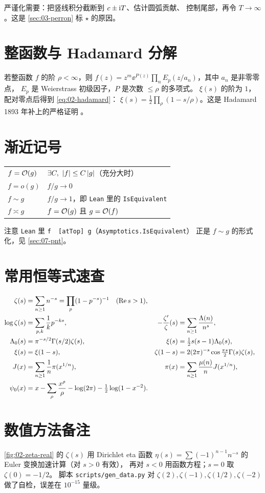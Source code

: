 严谨化需要：把竖线积分截断到 $c\pm\mathrm{i} T$、估计圆弧贡献、
控制尾部，再令 $T\to\infty$。这是 \cref{sec:03-perron} 标 $\star$ 的原因。

\section{整函数与 Hadamard 分解}
若整函数 $f$ 的阶 $\rho<\infty$，则
$f(z)=z^m\ee^{P(z)}\prod_n E_p(z/a_n)$，其中 $a_n$ 是非零零点，
$E_p$ 是 Weierstrass 初级因子，$P$ 是次数 $\le\rho$ 的多项式。
$\xi(s)$ 的阶为 $1$，配对零点后得到 \cref{eq:02-hadamard}：
$\xi(s)=\tfrac12\prod_\rho(1-s/\rho)$。这是 Hadamard 1893 年补上的严格证明
\cite{hadamard1893}。

\section{渐近记号}
\begin{center}\small
\begin{tabular}{@{}ll@{}}
\toprule
$f=\mathcal{O}(g)$ & $\exists C,\ \abs{f}\le C\abs{g}$（充分大时）\\
$f=o(g)$ & $f/g\to0$\\
$f\sim g$ & $f/g\to1$，即 \texttt{Lean} 里的 \texttt{IsEquivalent}\\
$f\asymp g$ & $f=\mathcal{O}(g)$ 且 $g=\mathcal{O}(f)$\\
\bottomrule
\end{tabular}
\end{center}
注意 \texttt{Lean} 里 \texttt{f ~[atTop] g}（\texttt{Asymptotics.IsEquivalent}）
正是 $f\sim g$ 的形式化，见 \cref{sec:07-pnt}。

\section{常用恒等式速查}
\begin{align}
 \zeta(s)&=\sum_{n\ge1}n^{-s}=\prod_p(1-p^{-s})^{-1}\quad(\operatorname{Re} s>1),\\
 \log\zeta(s)&=\sum_{p,k}\frac{1}{k}p^{-ks},&
 -\frac{\zeta'}{\zeta}(s)&=\sum_{n\ge1}\frac{\Lambda(n)}{n^{s}},\\
 \Lambda_0(s)&=\pi^{-s/2}\Gamma(s/2)\zeta(s),&
 \xi(s)&=\tfrac12 s(s-1)\Lambda_0(s),\\
 \xi(s)&=\xi(1-s),&
 \zeta(1-s)&=2(2\pi)^{-s}\cos\tfrac{\pi s}{2}\Gamma(s)\zeta(s),\\
 J(x)&=\sum_{n\ge1}\frac1n\pi(x^{1/n}),&
 \pi(x)&=\sum_{n\ge1}\frac{\mu(n)}{n}J(x^{1/n}),\\
 \psi_0(x)&=x-\sum_\rho\frac{x^\rho}{\rho}-\log(2\pi)-\tfrac12\log(1-x^{-2}).
\end{align}

\section{数值方法备注}
\cref{fig:02-zeta-real} 的 $\zeta(s)$ 用 Dirichlet eta 函数
$\eta(s)=\sum(-1)^{n-1}n^{-s}$ 的 Euler 变换加速计算（对 $s>0$ 有效），
再对 $s<0$ 用函数方程；$s=0$ 取 $\zeta(0)=-1/2$。
脚本 \texttt{scripts/gen\_data.py} 对
$\zeta(2),\zeta(-1),\zeta(1/2),\zeta(-2)$ 做了自检，误差在 $10^{-15}$ 量级。